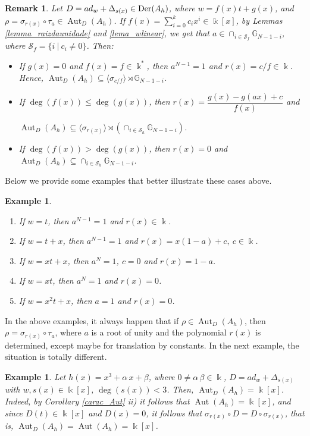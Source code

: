 \documentclass{article}
\numberwithin{equation}{section}\theoremstyle{plain}
\newtheorem{example}[theorem]{Example}
\newtheorem{remark}[theorem]{Remark}
\newcommand{\der}{{\rm Der}}
\DeclareMathOperator{\Aut}{Aut}
\begin{document}
\begin{remark}
    Let $D=ad_w + \Delta_{s(x)} \in \der(A_h)$, where $w = f(x)t +g(x)$, and $\rho = \sigma_{r(x)} \circ \tau_a \in \Aut_D(A_h)$.
    If $f(x)=\sum_{i=0}^k c_ix^i\in \Bbbk[x]$, by Lemmas \ref{lemma_raizdaunidade} and \ref{lema_wlinear}, we get that $a\in \cap_{i \in \mathcal{S}_f}\mathbb{G}_{N-1-i}$, where $\mathcal{S}_f=\{i \ | \ c_i\neq 0\}$.
    Then:
    \begin{itemize}
  \item[(i)] If $g(x)=0$ and $f(x) = f \in \Bbbk^\ast$, then $a^{N-1}=1$ and $r(x) = c/f\in \Bbbk$.
  Hence, $\Aut_D(A_h) \subseteq  \langle \sigma_{c/f} \rangle \rtimes \mathbb{G}_{N-1-i}$.
  
     \item[(ii)] If $\deg(f(x))\leq \deg(g(x))$, then $r(x)=\dfrac{g(x)-g(ax)+c }{f(x)}$ and 
    
    $\Aut_D(A_h)\subseteq \langle \sigma_{r(x)} \rangle \rtimes \left(\cap_{i \in \mathcal{S}_h}\mathbb{G}_{N-1-i}\right)$.
  
  
        \item[(iii)] If $\deg(f(x))>\deg(g(x))$, then $r(x)=0$ and
        $\Aut_D(A_h)\subseteq \cap_{i \in \mathcal{S}_h}\mathbb{G}_{N-1-i}$.
    \end{itemize}
\end{remark}

Below we provide some examples that better illustrate these cases above.

\begin{example}
    \begin{enumerate}
         \item If $w=t$, then $a^{N-1}=1$ and $r(x)\in \Bbbk$.
    \item If $w=t+x$, then $a^{N-1}=1$ and $r(x)=x(1-a)+c, \ c\in \Bbbk$.
    \item If $w=xt+x$, then $a^{N}=1$, $c=0$ and $r(x)=1-a$.
      \item If $w=xt$, then $a^N=1$ and $r(x)=0$.
      \item If $w=x^2t+x$, then $a=1$ and $r(x)=0$.
        \end{enumerate}
\end{example}


\medbreak


 In the above examples, it always happen that if $\rho \in \Aut_D(A_h)$, then $\rho = \sigma_{r(x)} \circ \tau_a$, where $a$ is a root of unity and the polynomial $r(x)$ is determined, except maybe for translation by constants.
In the next example, the situation is totally different.
\begin{example}
    Let $h(x)=x^3 + \alpha \, x + \beta$, where $0 \neq \alpha \,\beta \in \Bbbk$, $D=ad_w + \Delta_{s(x)}$ with $w, s(x) \in \Bbbk[x]$, $\deg(s(x))<3$.
    Then, $\Aut_D(A_h) = \Bbbk[x]$.
    Indeed, by Corollary \ref{carac_Aut} ii) it follows that $\Aut(A_h) = \Bbbk[x]$, and since $D(t) \in \Bbbk[x]$ and $D(x)=0$, it follows that $\sigma_{r(x)} \circ D = D \circ \sigma_{r(x)}$, that is, $\Aut_D(A_h) = \Aut(A_h) = \Bbbk[x]$.
\end{example}
\end{document}
